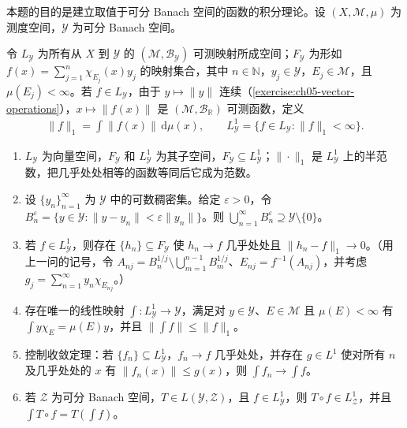 \documentclass[../../main.tex]{subfiles}
\begin{document}
\begin{exercise}\label{exercise:ch05-vector-integration}
本题的目的是建立取值于可分 Banach 空间的函数的积分理论。设 $(X,\mathscr M,\mu)$ 为测度空间，$\mathcal Y$ 为可分 Banach 空间。
\begin{definition*}[本题的向量值函数类]\label{definition:ch05-vector-integrable-classes}
令 $L_{\mathcal Y}$ 为所有从 $X$ 到 $\mathcal Y$ 的 $(\mathscr M,\mathcal B_{\mathcal Y})$ 可测映射所成空间；$F_{\mathcal Y}$ 为形如 $f(x)=\sum_{j=1}^n\chi_{E_j}(x)y_j$ 的映射集合，其中 $n\in\mathbb N$，$y_j\in\mathcal Y$，$E_j\in\mathscr M$，且 $\mu(E_j)<\infty$。若 $f\in L_{\mathcal Y}$，由于 $y\mapsto\|y\|$ 连续（\cref{exercise:ch05-vector-operations}），$x\mapsto\|f(x)\|$ 是 $(\mathscr M,\mathcal B_{\mathbb R})$ 可测函数，定义
\begin{align*}
\|f\|_1=\int\|f(x)\|\,\mathrm d\mu(x),\qquad
L_{\mathcal Y}^1=\{f\in L_{\mathcal Y}:\|f\|_1<\infty\}.
\end{align*}
\end{definition*}
\begin{enumerate}
\item\label{item:ch05-vector-integral-spaces} $L_{\mathcal Y}$ 为向量空间，$F_{\mathcal Y}$ 和 $L_{\mathcal Y}^1$ 为其子空间，$F_{\mathcal Y}\subseteq L_{\mathcal Y}^1$；$\|\cdot\|_1$ 是 $L_{\mathcal Y}^1$ 上的半范数，把几乎处处相等的函数等同后它成为范数。
\item\label{item:ch05-vector-relative-balls} 设 $\{y_n\}_{n=1}^{\infty}$ 为 $\mathcal Y$ 中的可数稠密集。给定 $\varepsilon>0$，令 $B_n^\varepsilon=\{y\in\mathcal Y:\|y-y_n\|<\varepsilon\|y_n\|\}$。则 $\bigcup_{n=1}^{\infty}B_n^\varepsilon\supseteq\mathcal Y\setminus\{0\}$。
\item\label{item:ch05-vector-simple-approximation} 若 $f\in L_{\mathcal Y}^1$，则存在 $\{h_n\}\subseteq F_{\mathcal Y}$ 使 $h_n\to f$ 几乎处处且 $\|h_n-f\|_1\to0$。（用上一问的记号，令 $A_{nj}=B_n^{1/j}\setminus\bigcup_{m=1}^{n-1}B_m^{1/j}$、$E_{nj}=f^{-1}(A_{nj})$，并考虑 $g_j=\sum_{n=1}^{\infty}y_n\chi_{E_{nj}}$。）
\item\label{item:ch05-vector-integral-existence} 存在唯一的线性映射 $\int:L_{\mathcal Y}^1\to\mathcal Y$，满足对 $y\in\mathcal Y$、$E\in\mathscr M$ 且 $\mu(E)<\infty$ 有 $\int y\chi_E=\mu(E)y$，并且 $\|\int f\|\le\|f\|_1$。
\item\label{item:ch05-vector-dct} 控制收敛定理：若 $\{f_n\}\subseteq L_{\mathcal Y}^1$，$f_n\to f$ 几乎处处，并存在 $g\in L^1$ 使对所有 $n$ 及几乎处处的 $x$ 有 $\|f_n(x)\|\le g(x)$，则 $\int f_n\to\int f$。
\item\label{item:ch05-vector-integral-operator} 若 $\mathcal Z$ 为可分 Banach 空间，$T\in L(\mathcal Y,\mathcal Z)$，且 $f\in L_{\mathcal Y}^1$，则 $T\circ f\in L_{\mathcal Z}^1$，并且 $\int T\circ f=T(\int f)$。
\end{enumerate}
\end{exercise}
\end{document}
